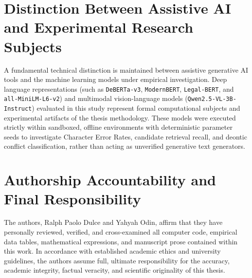 \section*{Distinction Between Assistive AI and Experimental Research Subjects}

A fundamental technical distinction is maintained between assistive generative AI tools and the machine learning models under empirical investigation. Deep language representations (such as \texttt{DeBERTa-v3}, \texttt{ModernBERT}, \texttt{Legal-BERT}, and \texttt{all-MiniLM-L6-v2}) and multimodal vision-language models (\texttt{Qwen2.5-VL-3B-Instruct}) evaluated in this study represent formal computational subjects and experimental artifacts of the thesis methodology. These models were executed strictly within sandboxed, offline environments with deterministic parameter seeds to investigate Character Error Rates, candidate retrieval recall, and deontic conflict classification, rather than acting as unverified generative text generators.

\section*{Authorship Accountability and Final Responsibility}

The authors, Ralph Paolo Dulce and Yahyah Odin, affirm that they have personally reviewed, verified, and cross-examined all computer code, empirical data tables, mathematical expressions, and manuscript prose contained within this work. In accordance with established academic ethics and university guidelines, the authors assume full, ultimate responsibility for the accuracy, academic integrity, factual veracity, and scientific originality of this thesis.

